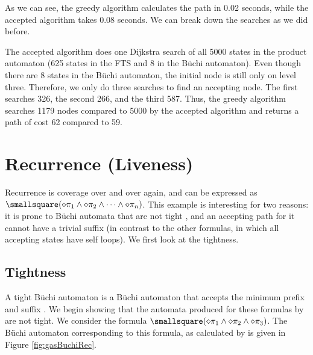 As we can see, the greedy algorithm calculates the path in 0.02 seconds, while the accepted algorithm takes 0.08 seconds. We can break down the searches as we did before. 

The accepted algorithm does one Dijkstra search of all 5000 states in the product automaton (625 states in the FTS and 8 in the B\"uchi automaton). Even though there are 8 states in the B\"uchi automaton, the initial node is still only on level three. Therefore, we only do three searches to find an accepting node. The first searches 326, the second 266, and the third 587. Thus, the greedy algorithm searches 1179 nodes compared to 5000 by the accepted algorithm and returns a path of cost 62 compared to 59.

\section{Recurrence (Liveness)}
Recurrence is coverage over and over again, and can be expressed as $\smallsquare(\diamond \pi_1 \land \diamond \pi_2 \land \dots \land \diamond \pi_n)$. This example is interesting for two reasons: it is prone to B\"{u}chi automata that are not tight \cite{schuppan05}, and an accepting path for it cannot have a trivial suffix (in contrast to the other formulas, in which all accepting states have self loops). We first look at the tightness.

\subsection{Tightness}
A tight B\"uchi automaton is a B\"uchi automaton that accepts the minimum prefix and suffix \cite{schuppan05}. We begin showing that the automata produced for these formulas by \cite{ltlbuchiwebsite} are not tight. We consider the formula $\smallsquare(\diamond \pi_1 \land \diamond \pi_2 \land \diamond \pi_3)$. The B\"{u}chi automaton corresponding to this formula, as calculated by \cite{gastin01} is given in Figure \ref{fig:gasBuchiRec}.

